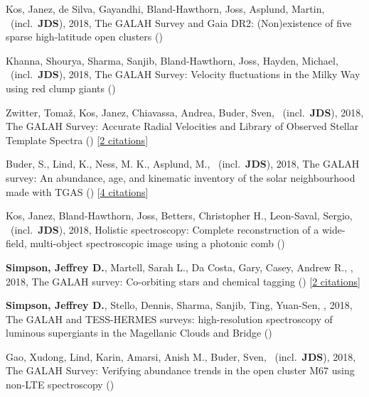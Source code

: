 \item[{\color{numcolor}\scriptsize8}] Kos, Janez, de Silva, Gayandhi, Bland-Hawthorn, Joss, Asplund, Martin, \etal\ (incl.\ \textbf{JDS}), 2018, The GALAH Survey and Gaia DR2: (Non)existence of five sparse high-latitude open clusters ()

\item[{\color{numcolor}\scriptsize7}] Khanna, Shourya, Sharma, Sanjib, Bland-Hawthorn, Joss, Hayden, Michael, \etal\ (incl.\ \textbf{JDS}), 2018, The GALAH Survey: Velocity fluctuations in the Milky Way using red clump giants ()

\item[{\color{numcolor}\scriptsize6}] Zwitter, Toma{\v{z}}, Kos, Janez, Chiavassa, Andrea, Buder, Sven, \etal\ (incl.\ \textbf{JDS}), 2018, The GALAH Survey: Accurate Radial Velocities and Library of Observed Stellar Template Spectra () [\href{http://adsabs.harvard.edu/abs/2018arXiv180406344Z}{2 citations}]

\item[{\color{numcolor}\scriptsize5}] Buder, S., Lind, K., Ness, M. K., Asplund, M., \etal\ (incl.\ \textbf{JDS}), 2018, The GALAH survey: An abundance, age, and kinematic inventory of the solar neighbourhood made with TGAS () [\href{http://adsabs.harvard.edu/abs/2018arXiv180405869B}{4 citations}]

\item[{\color{numcolor}\scriptsize4}] Kos, Janez, Bland-Hawthorn, Joss, Betters, Christopher H., Leon-Saval, Sergio, \etal\ (incl.\ \textbf{JDS}), 2018, Holistic spectroscopy: Complete reconstruction of a wide-field, multi-object spectroscopic image using a photonic comb ()

\item[{\color{numcolor}\scriptsize3}] \textbf{Simpson, Jeffrey D.}, Martell, Sarah L., Da Costa, Gary, Casey, Andrew R., \etal, 2018, The GALAH survey: Co-orbiting stars and chemical tagging () [\href{http://adsabs.harvard.edu/abs/2018arXiv180405894S}{2 citations}]

\item[{\color{numcolor}\scriptsize2}] \textbf{Simpson, Jeffrey D.}, Stello, Dennis, Sharma, Sanjib, Ting, Yuan-Sen, \etal, 2018, The GALAH and TESS-HERMES surveys: high-resolution spectroscopy of luminous supergiants in the Magellanic Clouds and Bridge ()

\item[{\color{numcolor}\scriptsize1}] Gao, Xudong, Lind, Karin, Amarsi, Anish M., Buder, Sven, \etal\ (incl.\ \textbf{JDS}), 2018, The GALAH Survey: Verifying abundance trends in the open cluster M67 using non-LTE spectroscopy ()